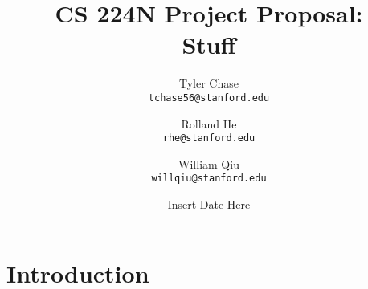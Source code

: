 \documentclass[11pt]{article}
\title{\vspace{-2cm}CS 224N Project Proposal: \\ Stuff}
\author{Tyler Chase \\ \texttt{tchase56@stanford.edu} \and
  Rolland He \\ \texttt{rhe@stanford.edu} \and
  William Qiu \\ \texttt{willqiu@stanford.edu}}
\date{Insert Date Here}
\begin{document}
\maketitle

\vspace{-1cm}
\section{Introduction}


\end{document}
